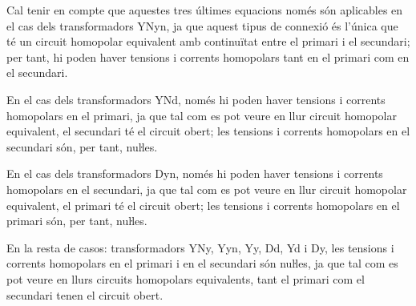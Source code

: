 Cal tenir en compte que aquestes tres últimes equacions  només són aplicables en el cas dels transformadors YNyn, ja que aquest tipus de connexió és l'única que té un circuit homopolar equivalent amb continuïtat entre el primari i el secundari; per tant, hi poden haver tensions i corrents homopolars tant en el primari com en el secundari.

En el cas dels transformadors YNd, només hi poden haver tensions i corrents homopolars en el primari, ja que tal com es pot veure en llur circuit homopolar equivalent, el secundari té el circuit obert; les tensions i corrents homopolars en el secundari són, per tant, nuŀles.


En el cas dels transformadors Dyn, només hi poden haver tensions i corrents homopolars en el secundari, ja que tal com es pot veure en llur circuit homopolar equivalent, el primari té el circuit obert; les tensions i corrents homopolars en el primari són, per tant, nuŀles.

En la resta de casos: transformadors YNy, Yyn, Yy, Dd, Yd i Dy, les tensions i corrents homopolars en el primari i en el secundari són  nuŀles, ja que tal com es pot veure en llurs circuits homopolars equivalents, tant el primari com el secundari tenen el circuit obert.


